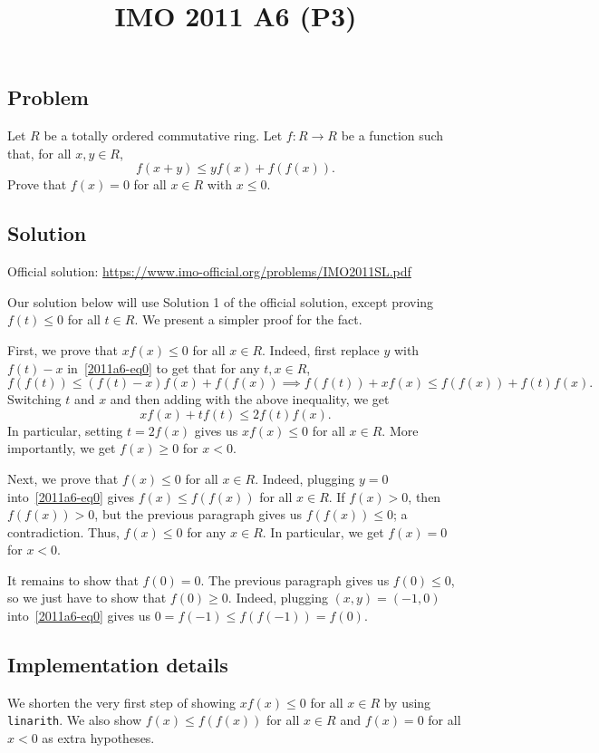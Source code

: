 \documentclass{article}
\title{IMO 2011 A6 (P3)}
\author{}
\date{}
\begin{document}
\maketitle



\subsection*{Problem}

Let $R$ be a totally ordered commutative ring.
Let $f : R \to R$ be a function such that, for all $x, y \in R$,
\[ f(x + y) \leq y f(x) + f(f(x)). \tag{*}\label{2011a6-eq0} \]
Prove that $f(x) = 0$ for all $x \in R$ with $x \leq 0$.



\subsection*{Solution}

Official solution: \url{https://www.imo-official.org/problems/IMO2011SL.pdf}

Our solution below will use Solution 1 of the official solution, except proving $f(t) \leq 0$ for all $t \in R$.
We present a simpler proof for the fact.

First, we prove that $x f(x) \leq 0$ for all $x \in R$.
Indeed, first replace $y$ with $f(t) - x$ in~\eqref{2011a6-eq0} to get that for any $t, x \in R$,
\[ f(f(t)) \leq (f(t) - x) f(x) + f(f(x)) \implies f(f(t)) + x f(x) \leq f(f(x)) + f(t) f(x). \]
Switching $t$ and $x$ and then adding with the above inequality, we get
\[ x f(x) + t f(t) \leq 2 f(t) f(x). \]
In particular, setting $t = 2 f(x)$ gives us $xf(x) \leq 0$ for all $x \in R$.
More importantly, we get $f(x) \geq 0$ for $x < 0$.

Next, we prove that $f(x) \leq 0$ for all $x \in R$.
Indeed, plugging $y = 0$ into~\eqref{2011a6-eq0} gives $f(x) \leq f(f(x))$ for all $x \in R$.
If $f(x) > 0$, then $f(f(x)) > 0$, but the previous paragraph gives us $f(f(x)) \leq 0$; a contradiction.
Thus, $f(x) \leq 0$ for any $x \in R$.
In particular, we get $f(x) = 0$ for $x < 0$.

It remains to show that $f(0) = 0$.
The previous paragraph gives us $f(0) \leq 0$, so we just have to show that $f(0) \geq 0$.
Indeed, plugging $(x, y) = (-1, 0)$ into~\eqref{2011a6-eq0} gives us $0 = f(-1) \leq f(f(-1)) = f(0)$.



\subsection*{Implementation details}

We shorten the very first step of showing $x f(x) \leq 0$ for all $x \in R$ by using \texttt{linarith}.
We also show $f(x) \leq f(f(x))$ for all $x \in R$ and $f(x) = 0$ for all $x < 0$ as extra hypotheses.
\end{document}

